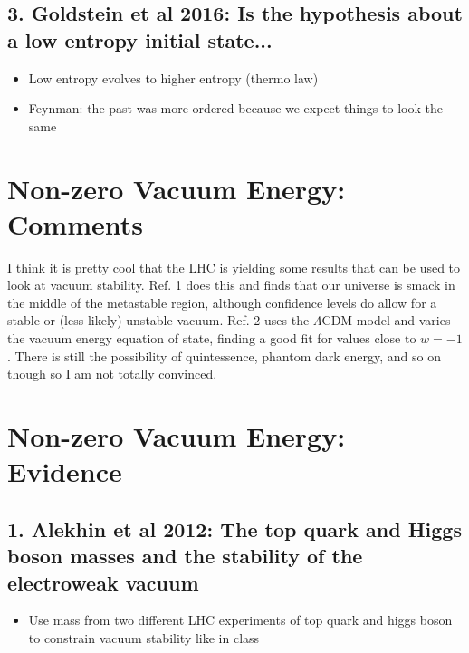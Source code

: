 \documentclass{article}
\begin{document}
\subsection*{3. Goldstein et al 2016: Is the hypothesis about a low entropy initial state...}
\begin{itemize}
\item Low entropy evolves to higher entropy (thermo law)
\item Feynman: the past was more ordered because we expect things to look the same
\end{itemize}


\newpage
\section{Non-zero Vacuum Energy: Comments}
I think it is pretty cool that the LHC is yielding some results that can be used to look at vacuum stability. Ref. 1 does this and finds that our universe is smack in the middle of the metastable region, although confidence levels do allow for a stable or (less likely) unstable vacuum. Ref. 2 uses the $\Lambda$CDM model and varies the vacuum energy equation of state, finding a good fit for values close to $w=-1$. There is still the possibility of quintessence, phantom dark energy, and so on though so I am not totally convinced. 

\newpage
\section*{Non-zero Vacuum Energy: Evidence}
\subsection*{1. Alekhin et al 2012: The top quark and Higgs boson masses and the stability of the electroweak vacuum}
\begin{itemize}
\item Use mass from two different LHC experiments of top quark and higgs boson to constrain vacuum stability like in class
\end{itemize}
\end{document}
